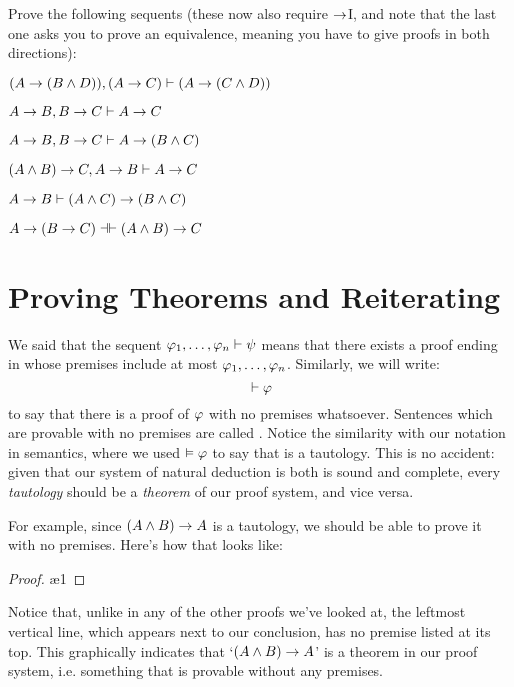 \problempart
Prove the following sequents (these now also require $\rightarrow$I, and note that the last one asks you to prove an equivalence, meaning you have to give proofs in both directions):

\begin{earg}
\item $(A\rightarrow (B\wedge  D)), (A\rightarrow C) \vdash (A\rightarrow (C\wedge  D))$
\item $A \rightarrow B, B \rightarrow C \vdash A \rightarrow C$
\item $A \rightarrow B, B \rightarrow C \vdash A \rightarrow (B \wedge C)$
\item $(A\wedge  B)\rightarrow C, A\rightarrow B \vdash A\rightarrow C$
\item $A \rightarrow B \vdash (A \wedge C) \rightarrow (B \wedge C)$
\item $A \eif (B \eif C) \pequiv (A \eand B) \eif C$
\end{earg}




\section{Proving Theorems and Reiterating}\label{s:TheoremsReiterating}

We said that the sequent $\mathcal{\varphi}_1, \ldots, \mathcal{\varphi}_n \vdash \mathcal{\psi}$ means that there exists a proof ending in \meta{\psi} whose premises include at most $\mathcal{\varphi}_1, \ldots, \mathcal{\varphi}_n$.  Similarly, we will write:
$${} \vdash \mathcal{\varphi}$$
to say that there is a proof of $\mathcal{\varphi}$ with no premises whatsoever.  Sentences which are provable with no premises are called .  Notice the similarity with our notation in semantics, where we used $\vDash \mathcal{\varphi}$ to say that \meta{\varphi} is a tautology.  This is no accident: given that our system of natural deduction is both is sound and complete, every \emph{tautology} should be a \emph{theorem} of our proof system, and vice versa.

For example, since $(A \wedge B) \rightarrow A$ is a tautology, we should be able to prove it with no premises.  Here's how that looks like:\\
\begin{proof}
\open
{}  
 \ae{1}
\close
{} 
\end{proof}
\noindent Notice that, unlike in any of the other proofs we've looked at, the leftmost vertical line, which appears next to our conclusion, has no premise listed at its top.  This graphically indicates that `$(A\wedge B)\rightarrow A$' is a theorem in our proof system, i.e. something that is provable without any premises.

